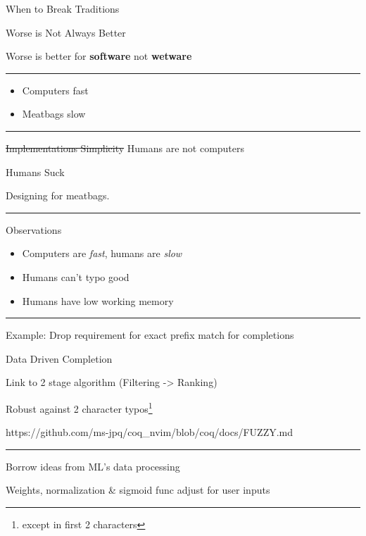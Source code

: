 \documentclass{beamer}
\begin{document}
\begin{frame}[standout]

	When to Break Traditions

\end{frame}


\begin{frame}{Worse is Not Always Better}

	Worse is better for \textbf{software} not \textbf{wetware}

	\rule{\textwidth}{0.1em}

	\begin{itemize}

		\item Computers fast

		\item Meatbags slow

	\end{itemize}

	\rule{\textwidth}{0.1em}

	\st{Implementations Simplicity} Humans are not computers

\end{frame}


\begin{frame}{Humans Suck}

	Designing for meatbags.

	\rule{\textwidth}{0.1em}

	\begin{block}{Observations}

		\begin{itemize}

			\item Computers are \textit{fast}, humans are \textit{slow}

			\item Humans can't typo good

			\item Humans have low working memory

		\end{itemize}

	\end{block}

	\rule{\textwidth}{0.1em}

	Example: Drop requirement for exact prefix match for completions

\end{frame}


\begin{frame}{Data Driven Completion}

	Link to 2 stage algorithm (Filtering -> Ranking)

	Robust against 2 character typos\footnote{except in first 2 characters}

	https://github.com/ms-jpq/coq\_nvim/blob/coq/docs/FUZZY.md

	\rule{\textwidth}{0.1em}

	Borrow ideas from ML's data processing

	Weights, normalization \& sigmoid func adjust for user inputs

\end{frame}
\end{document}
